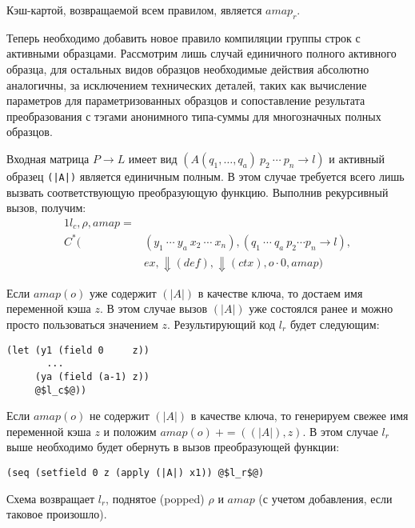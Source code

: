 Кэш-картой, возвращаемой всем правилом, является $amap_r$.

Теперь необходимо добавить новое правило компиляции группы строк с активными образцами. Рассмотрим лишь случай единичного полного активного образца, для остальных видов образцов необходимые действия абсолютно аналогичны, за исключением технических деталей, таких как вычисление параметров для параметризованных образцов и сопоставление результата преобразования с тэгами анонимного типа-суммы для многозначных полных образцов.

Входная матрица $P \to L$ имеет вид $(A(q_1,\ldots,q_a)\ p_2\ \cdots\ p_n \to l)$ и активный образец \lstinline{(|A|)} является единичным полным. В этом случае требуется всего лишь вызвать соответствующую преобразующую функцию. Выполнив рекурсивный вызов, получим:
\begin{alignat*}{1}
l_c, \rho, amap = \\
C^*(&(y_1\ \cdots\ y_a\ x_2\ \cdots\ x_n), (q_1\ \cdots\ q_a\ p_2 \cdots p_n \to l),\\
&ex, \Downarrow(def), \Downarrow(ctx), o\cdot0, amap)
\end{alignat*}

Если $amap(o)$ уже содержит $(|A|)$ в качестве ключа, то достаем имя переменной кэша $z$. В этом случае вызов $(|A|)$ уже состоялся ранее и можно просто пользоваться значением $z$. Результирующий код $l_r$ будет следующим: 

\noindent
\begin{minipage}{\linewidth}
\begin{lstlisting}[language=lambda,escapechar=@] 
(let (y1 (field 0     z))
       ...
     (ya (field (a-1) z))
     @$l_c$@))
\end{lstlisting}
\end{minipage}

Если $amap(o)$ не содержит $(|A|)$ в качестве ключа, то генерируем свежее имя переменной кэша $z$ и положим $amap(o)\ += ((|A|),z)$. В этом случае $l_r$ выше необходимо будет обернуть в вызов преобразующей функции:

\noindent
\begin{minipage}{\linewidth}
\begin{lstlisting}[language=lambda,escapechar=@] 
(seq (setfield 0 z (apply (|A|) x1)) @$l_r$@)
\end{lstlisting}
\end{minipage}

Схема возвращает $l_r$, поднятое (popped) $\rho$ и $amap$ (с учетом добавления, если таковое произошло).

